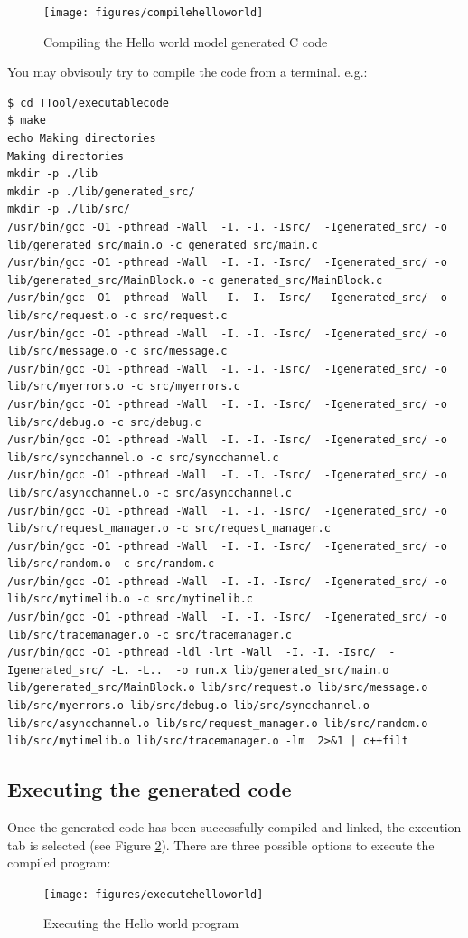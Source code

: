 \documentclass[12pt]{article}
\begin{document}
\begin{figure}[htbp]
\centering
\texttt{[image: figures/compilehelloworld]}
\caption{Compiling the Hello world model generated C code} \label{fig:compilehelloworld}
\end{figure}

You may obvisouly try to compile the code from a terminal. e.g.:
\begin{lstlisting}
$ cd TTool/executablecode
$ make
echo Making directories
Making directories
mkdir -p ./lib
mkdir -p ./lib/generated_src/
mkdir -p ./lib/src/ 
/usr/bin/gcc -O1 -pthread -Wall  -I. -I. -Isrc/  -Igenerated_src/ -o lib/generated_src/main.o -c generated_src/main.c
/usr/bin/gcc -O1 -pthread -Wall  -I. -I. -Isrc/  -Igenerated_src/ -o lib/generated_src/MainBlock.o -c generated_src/MainBlock.c
/usr/bin/gcc -O1 -pthread -Wall  -I. -I. -Isrc/  -Igenerated_src/ -o lib/src/request.o -c src/request.c
/usr/bin/gcc -O1 -pthread -Wall  -I. -I. -Isrc/  -Igenerated_src/ -o lib/src/message.o -c src/message.c
/usr/bin/gcc -O1 -pthread -Wall  -I. -I. -Isrc/  -Igenerated_src/ -o lib/src/myerrors.o -c src/myerrors.c
/usr/bin/gcc -O1 -pthread -Wall  -I. -I. -Isrc/  -Igenerated_src/ -o lib/src/debug.o -c src/debug.c
/usr/bin/gcc -O1 -pthread -Wall  -I. -I. -Isrc/  -Igenerated_src/ -o lib/src/syncchannel.o -c src/syncchannel.c
/usr/bin/gcc -O1 -pthread -Wall  -I. -I. -Isrc/  -Igenerated_src/ -o lib/src/asyncchannel.o -c src/asyncchannel.c
/usr/bin/gcc -O1 -pthread -Wall  -I. -I. -Isrc/  -Igenerated_src/ -o lib/src/request_manager.o -c src/request_manager.c
/usr/bin/gcc -O1 -pthread -Wall  -I. -I. -Isrc/  -Igenerated_src/ -o lib/src/random.o -c src/random.c
/usr/bin/gcc -O1 -pthread -Wall  -I. -I. -Isrc/  -Igenerated_src/ -o lib/src/mytimelib.o -c src/mytimelib.c
/usr/bin/gcc -O1 -pthread -Wall  -I. -I. -Isrc/  -Igenerated_src/ -o lib/src/tracemanager.o -c src/tracemanager.c
/usr/bin/gcc -O1 -pthread -ldl -lrt -Wall  -I. -I. -Isrc/  -Igenerated_src/ -L. -L..  -o run.x lib/generated_src/main.o lib/generated_src/MainBlock.o lib/src/request.o lib/src/message.o lib/src/myerrors.o lib/src/debug.o lib/src/syncchannel.o lib/src/asyncchannel.o lib/src/request_manager.o lib/src/random.o lib/src/mytimelib.o lib/src/tracemanager.o -lm  2>&1 | c++filt
\end{lstlisting}

\subsection{Executing the generated code}
Once the generated code has been successfully compiled and linked, the execution tab is selected (see Figure \ref{fig:executehelloworld}). There are three possible options to execute the compiled program:
\begin{figure}[htbp]
\centering
\texttt{[image: figures/executehelloworld]}
\caption{Executing the Hello world program} \label{fig:executehelloworld}
\end{figure}
\end{document}
